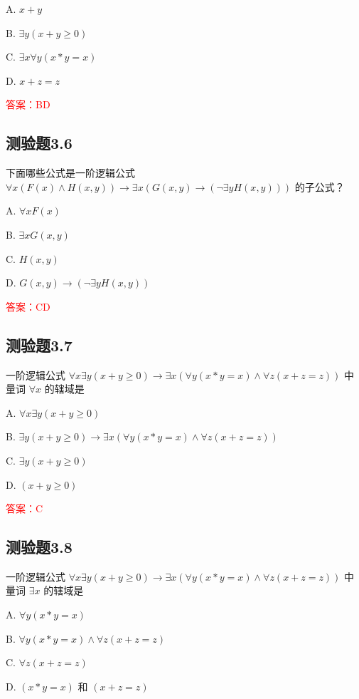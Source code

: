 \documentclass[UTF8, heading=true]{ctexart}
\begin{document}
A. $
x+y
$


B. $
\exists y(x+y \geq 0)
$


C. $
\exists x \forall y(x * y=x)
$


D. $
x+z=z
$

\textcolor{red}{答案：BD}

\subsection{测验题3.6}

下面哪些公式是一阶逻辑公式 $\forall x(F(x) \wedge H(x, y)) \rightarrow \exists x(G(x, y) \rightarrow(\neg \exists y H(x, y)))$ 的子公式？

A. $
\forall x F(x)
$


B. $
\exists x G(x, y)
$

C. $
H(x, y)
$

D. $
G(x, y) \rightarrow(\neg \exists y H(x, y))
$

\textcolor{red}{答案：CD}




\subsection{测验题3.7}

一阶逻辑公式 $\forall x \exists y(x+y \geq 0) \rightarrow \exists x(\forall y(x * y=x) \wedge \forall z(x+z=z))$ 中量词 $\forall x$ 的辖域是 $\qquad$

A. $\forall x \exists y(x+y \geq 0)$

B. $ \exists y(x+y \geq 0) \rightarrow \exists x(\forall y(x * y=x) \wedge \forall z(x+z=z))$

C. $\exists y(x+y \geq 0)$

D. $(x+y \geq 0)$

\textcolor{red}{答案：C}

\subsection{测验题3.8}

一阶逻辑公式 $\forall x \exists y(x+y \geq 0) \rightarrow \exists x(\forall y(x * y=x) \wedge \forall z(x+z=z))$ 中量词 $\exists x$ 的辖域是 $\qquad$

A. $ \forall y(x * y=x)$

B. $\forall y(x * y=x) \wedge \forall z(x+z=z)$

C. $\forall z(x+z=z)$

D. $(x * y=x)$ 和 $(x+z=z)$
\end{document}
